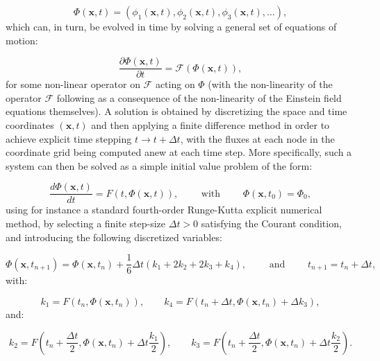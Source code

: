 \documentclass{article}
\begin{document}
\begin{equation}
\Phi \left( \mathbf{x}, t \right) = \left( \phi_1 \left( \mathbf{x}, t \right), \phi_2 \left( \mathbf{x}, t \right), \phi_3 \left( \mathbf{x}, t \right), \dots \right),
\end{equation}
which can, in turn, be evolved in time by solving a general set of equations of motion:

\begin{equation}
\frac{\partial \Phi \left( \mathbf{x}, t \right)}{\partial t} = \mathcal{F} \left( \Phi \left( \mathbf{x}, t \right) \right),
\end{equation}
for some non-linear operator on ${\mathcal{F}}$ acting on ${\Phi}$ (with the non-linearity of the operator ${\mathcal{F}}$ following as a consequence of the non-linearity of the Einstein field equations themselves). A solution is obtained by discretizing the space and time coordinates ${\left( \mathbf{x}, t \right)}$ and then applying a finite difference method in order to achieve explicit time stepping ${t \to t + \Delta t}$, with the fluxes at each node in the coordinate grid being computed anew at each time step\cite{calabrese}. More specifically, such a system can then be solved as a simple initial value problem of the form:

\begin{equation}
\frac{d \Phi \left( \mathbf{x}, t \right)}{d t} = F \left( t, \Phi \left( \mathbf{x}, t \right) \right), \qquad \text{ with } \qquad \Phi \left( \mathbf{x}, t_0 \right) = \Phi_0,
\end{equation}
using for instance a standard fourth-order Runge-Kutta explicit numerical method\cite{kreiss2}\cite{levy}, by selecting a finite step-size ${\Delta t > 0}$ satisfying the Courant condition, and introducing the following discretized variables:

\begin{equation}
\Phi \left( \mathbf{x}, t_{n + 1} \right) = \Phi \left( \mathbf{x}, t_n \right) + \frac{1}{6} \Delta t \left( k_1 + 2 k_2 + 2 k_3 + k_4 \right), \qquad \text{ and } \qquad t_{n + 1} = t_n + \Delta t,
\end{equation}
with:

\begin{equation}
k_1 = F \left( t_n, \Phi \left( \mathbf{x}, t_n \right) \right), \qquad k_4 = F \left( t_n + \Delta t, \Phi \left( \mathbf{x}, t_n \right) + \Delta k_3 \right),
\end{equation}
and:

\begin{equation}
k_2 = F \left( t_n + \frac{\Delta t}{2}, \Phi \left( \mathbf{x}, t_n \right) + \Delta t \frac{k_1}{2} \right), \qquad k_3 = F \left( t_n + \frac{\Delta t}{2}, \Phi \left( \mathbf{x}, t_n \right) + \Delta t \frac{k_2}{2} \right).
\end{equation}
\end{document}
